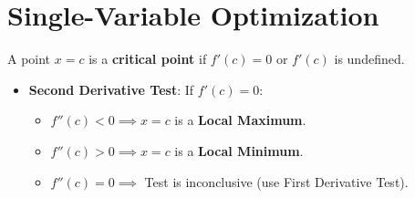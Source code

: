 \section{Single-Variable Optimization}

\begin{definition}
A point $x = c$ is a \textbf{critical point} if $f'(c) = 0$ or $f'(c)$ is undefined.
\begin{itemize}[leftmargin=1.5em]
    \item \textbf{Second Derivative Test}: If $f'(c) = 0$:
    \begin{itemize}
        \item $f''(c) < 0 \implies x = c$ is a \textbf{Local Maximum}.
        \item $f''(c) > 0 \implies x = c$ is a \textbf{Local Minimum}.
        \item $f''(c) = 0 \implies$ Test is inconclusive (use First Derivative Test).
    \end{itemize}
\end{itemize}
\end{definition}

